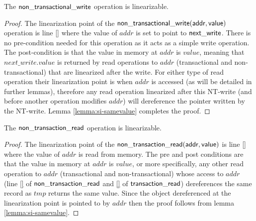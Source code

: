 \begin{lemma}
\label{lemma:si-ntwrite}
The $\sf{non\_transactional\_write}$ operation is linearizable.
\end{lemma}
\begin{proof}
The linearization point of the $\sf{non\_transactional\_write}(addr,value)$ operation
is line \ref{} where the value of $\mathit{addr}$ is set to point to $\sf{next\_write}$.
There is no pre-condition needed for this operation as it acts as a simple write operation.
The post-condition is that the value in memory at $\mathit{addr}$ is $\mathit{value}$, meaning that $\mathit{next\_write.value}$ is returned by 
read operations to $\mathit{addr}$ (transactional and non-transactional) that are linearized after the write.
For either type of read operation their linearization point is when $\mathit{addr}$ is accessed (as will be detailed in further lemmas),
therefore any read operation linearized after this NT-write (and before another operation modifies $\mathit{addr}$)
will dereference the pointer written by the NT-write.
Lemma \ref{lemma:si-samevalue} completes the proof.
\end{proof}


\begin{lemma}
\label{lemma:si-tread}
The $\sf{non\_transaction\_read}$ operation is linearizable.
\end{lemma}
\begin{proof}
The linearization point of the $\sf{non\_transaction\_read}(addr, value)$ is line \ref{} where the value
of $\mathit{addr}$ is read from memory.
The pre and post conditions are that the value in memory at $\mathit{addr}$ is $\mathit{value}$, or more specifically, 
any other read operation to $\mathit{addr}$ (transactional and non-transactional) whose access to $\mathit{addr}$
(line \ref{} of $\sf{non\_transaction\_read}$ and \ref{} of $\sf{transaction\_read}$) dereferences
the same record as $\mathit{tmp}$ returns the same value.
Since the object dereferenced at the linearization point is pointed to by $\mathit{addr}$ then the proof follows from
lemma \ref{lemma:si-samevalue}.
\end{proof}



